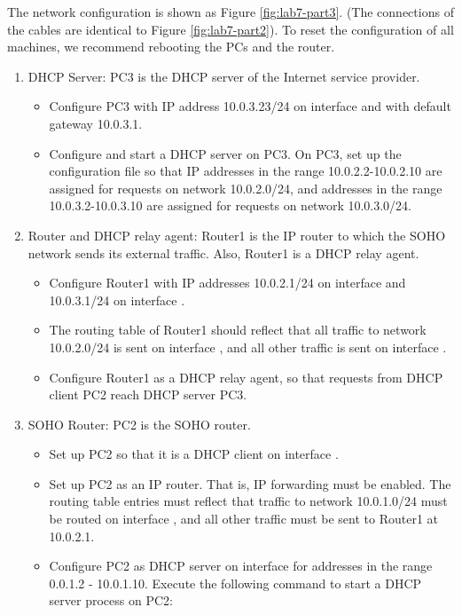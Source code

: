 The network configuration is shown as Figure \ref{fig:lab7-part3}. (The connections of the cables are identical to Figure \ref{fig:lab7-part2}). To reset the configuration of all machines, we recommend rebooting the PCs and the router.

\begin{enumerate}
	\item DHCP Server: PC3 is the DHCP server of the Internet service provider.
		\begin{itemize}
			\item Configure PC3 with IP address 10.0.3.23/24 on interface  and with default gateway 10.0.3.1.
			\item Configure and start a DHCP server on PC3. On PC3, set up the configuration file so that IP addresses in the range 10.0.2.2-10.0.2.10 are assigned for requests on network 10.0.2.0/24, and addresses in the range 10.0.3.2-10.0.3.10 are assigned for requests on network 10.0.3.0/24.
		\end{itemize}
	\item Router and DHCP relay agent: Router1 is the IP router to which the SOHO network sends its external traffic. Also, Router1 is a DHCP relay agent.
		\begin{itemize}
			\item Configure Router1 with IP addresses 10.0.2.1/24 on interface  and 10.0.3.1/24 on interface .
			\item The routing table of Router1 should reflect that all traffic to network 10.0.2.0/24 is sent on interface , and all other traffic is sent on interface .
			\item Configure Router1 as a DHCP relay agent, so that requests from DHCP client PC2 reach DHCP server PC3.
		\end{itemize}
	\item SOHO Router: PC2 is the SOHO router.
		\begin{itemize}
			\item Set up PC2 so that it is a DHCP client on interface .
			\item Set up PC2 as an IP router. That is, IP forwarding must be enabled. The routing table entries must reflect that traffic to network 10.0.1.0/24 must be routed on interface , and all other traffic must be sent to Router1 at 10.0.2.1.
			\item Configure PC2 as DHCP server on interface  for addresses in the range 0.0.1.2 - 10.0.1.10. Execute the following command to start a DHCP server process on PC2:

\end{itemize}
\end{enumerate}

